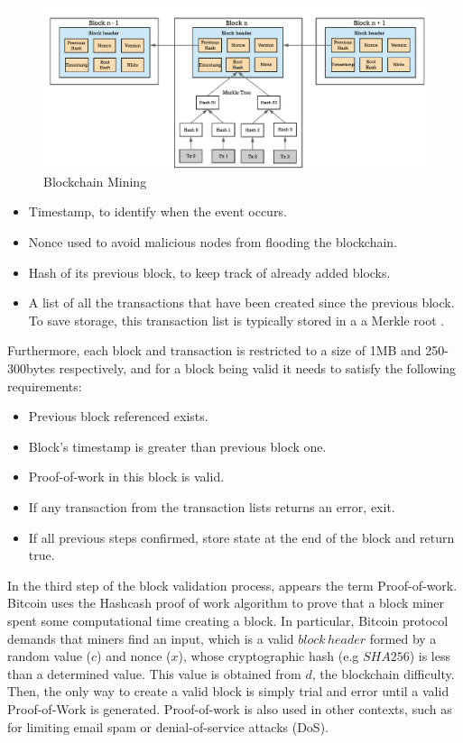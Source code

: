 \begin{figure}[t]
  	\includegraphics[width=1\linewidth]{gfx/mining}    
  	\caption{Blockchain Mining}
  	\label{fig:Blockchain mining}
\end{figure}

\begin{itemize}
	
	\item Timestamp, to identify when the event occurs.
	\item Nonce used to avoid malicious nodes from flooding the blockchain.
	\item Hash of its previous block, to keep track of already added blocks. 
	\item A list of all the transactions that have been created since the previous block. To save storage, this transaction list is typically stored in a a Merkle root \citep{merkle1987digital}.
\end{itemize}

Furthermore, each block and transaction is restricted to a size of 1MB and 250-300bytes respectively, and for a block being valid it needs to satisfy the following requirements:

\begin{itemize}
	
	\item Previous block referenced exists.
	\item Block's timestamp is greater than previous block one.
	\item Proof-of-work in this block is valid.
	\item If any transaction from the transaction lists returns an error, exit.
	\item If all previous steps confirmed, store state at the end of the block and return true.
\end{itemize}  

In the third step of the block validation process, appears the term Proof-of-work. Bitcoin uses the Hashcash proof of work algorithm to prove that a block miner spent some computational time creating a block. In particular, Bitcoin protocol demands that miners find an input, which is a valid $block \, header$ formed by a random value ($c$) and nonce ($x$), whose cryptographic hash (e.g $SHA256$) is less than a determined value. This value is obtained from $d$, the blockchain difficulty. Then, the only way to create a valid block is simply trial and error until a valid Proof-of-Work is generated. Proof-of-work is also used in other contexts, such as for limiting email spam or denial-of-service attacks (DoS).

